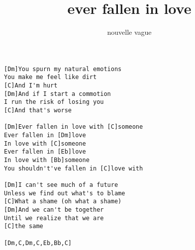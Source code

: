 \author{nouvelle vague}
\title{ever fallen in love}
\maketitle
\begin{verbatim}   
[Dm]You spurn my natural emotions
You make me feel like dirt
[C]And I'm hurt
[Dm]And if I start a commotion
I run the risk of losing you
[C]And that's worse

[Dm]Ever fallen in love with [C]someone
Ever fallen in [Dm]love
In love with [C]someone
Ever fallen in [Eb]love
In love with [Bb]someone
You shouldn't've fallen in [C]love with

[Dm]I can't see much of a future
Unless we find out what's to blame
[C]What a shame (oh what a shame)
[Dm]And we can't be together
Until we realize that we are 
[C]the same

[Dm,C,Dm,C,Eb,Bb,C]
\end{verbatim}